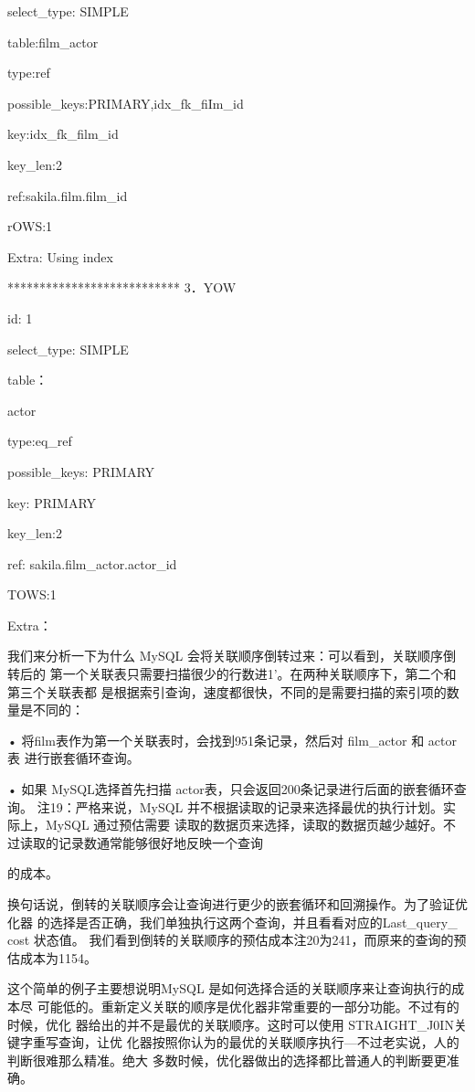 select\_type: SIMPLE

table:film\_actor

type:ref

possible\_keys:PRIMARY,idx\_fk\_fiIm\_id

key:idx\_fk\_film\_id

key\_len:2

ref:sakila.film.film\_id

rOWS:1

Extra: Using index

*************************** 3．YOW

id: 1

select\_type: SIMPLE

table：

actor

type:eq\_ref

possible\_keys: PRIMARY

key: PRIMARY

key\_len:2

ref: sakila.film\_actor.actor\_id

TOWS:1

Extra：

我们来分析一下为什么 MySQL 会将关联顺序倒转过来：可以看到，关联顺序倒转后的
第一个关联表只需要扫描很少的行数进1’。在两种关联顺序下，第二个和第三个关联表都
是根据索引查询，速度都很快，不同的是需要扫描的索引项的数量是不同的：

• 将film表作为第一个关联表时，会找到951条记录，然后对 film\_actor 和 actor表
进行嵌套循环查询。

• 如果 MySQL选择首先扫描 actor表，只会返回200条记录进行后面的嵌套循环查询。
注19：严格来说，MySQL 并不根据读取的记录来选择最优的执行计划。实际上，MySQL 通过预估需要
读取的数据页来选择，读取的数据页越少越好。不过读取的记录数通常能够很好地反映一个查询

的成本。

换句话说，倒转的关联顺序会让查询进行更少的嵌套循环和回溯操作。为了验证优化器
的选择是否正确，我们单独执行这两个查询，并且看看对应的Last\_query\_ cost 状态值。
我们看到倒转的关联顺序的预估成本注20为241，而原来的查询的预估成本为1154。

这个简单的例子主要想说明MySQL 是如何选择合适的关联顺序来让查询执行的成本尽
可能低的。重新定义关联的顺序是优化器非常重要的一部分功能。不过有的时候，优化
器给出的并不是最优的关联顺序。这时可以使用 STRAIGHT\_J0IN关键字重写查询，让优
化器按照你认为的最优的关联顺序执行—不过老实说，人的判断很难那么精准。绝大
多数时候，优化器做出的选择都比普通人的判断要更准确。

